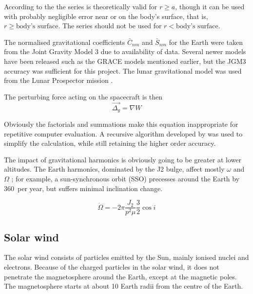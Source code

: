 According to the \textcite{WGS84} the series is theoretically valid for $r\geq a$, though it can be used with probably negligible error near or on the body's surface, that is, $r\geq\text{body's surface}$. The series should not be used for $r<\text{body's surface}$.

The normalised gravitational coefficients $\bar{C}_{nm}$ and $\bar{S}_{nm}$ for the Earth were taken from the Joint Gravity Model 3 \parencite[JGM3,][]{Tapley1996} due to availability of data. Several newer models have been released such as the GRACE models mentioned earlier, but the JGM3 accuracy was sufficient for this project. The lunar gravitational model was used from the Lunar Prospector mission \parencite{Konopliv2001}.

The perturbing force acting on the spacecraft is then
\begin{equation}
\vec{\Delta_g}=\nabla W\label{eq:Oblateness-perturbation}
\end{equation}

Obviously the factorials and summations make this equation inappropriate for repetitive computer evaluation. A recursive algorithm developed by \textcite{Montenbruck2000} was used to simplify the calculation, while still retaining the higher order accuracy. 

The impact of gravitational harmonics is obviously going to be greater at lower altitudes. The Earth harmonics, dominated by the J2 bulge, affect mostly $\omega$ and $\Omega$ \parencite{Eshagh2007, Montenbruck2000}; for example, a sun-synchronous orbit (SSO) precesses around the Earth by 360\degrees\ per year, but suffers minimal inclination change.

\begin{equation}
\dot\Omega = -2\pi\frac{J_2}{p^2\mu}\frac{3}{2}\cos i
\end{equation}




\subsection{Solar wind} \label{sub:Solar-Wind}

The solar wind consists of particles emitted by the Sun, mainly ionised nuclei and electrons. Because of the charged particles in the solar wind, it does not penetrate the magnetosphere around the Earth, except at the magnetic poles. The magnetosphere starts at about 10 Earth radii from the centre of the Earth.
 
